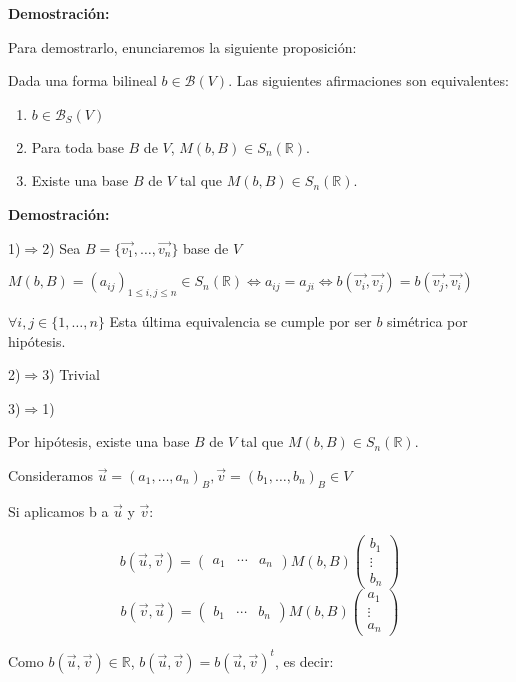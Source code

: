 \documentclass[x11names,table]{report}
\begin{document}
\textbf{Demostración:}

Para demostrarlo, enunciaremos la siguiente proposición:

Dada una forma bilineal $b\in\mathcal{B}(V)$. Las siguientes afirmaciones son equivalentes:

\begin{enumerate}
\item $b\in\mathcal{B}_S(V)$
\item Para toda base $B$ de $V$, $M(b,B)\in S_n(\mathbb{R})$.
\item Existe una base $B$ de $V$ tal que $M(b,B)\in S_n(\mathbb{R})$.
\end{enumerate}
\newpage
\textbf{Demostración:}

1)$\Rightarrow$2)
Sea $B=\{\vec{v_1},\dots,\vec{v_n}\}$ base de $V$

$M(b,B)=(a_{ij})_{1\leq i,j \leq n}\in S_n(\mathbb{R})\Leftrightarrow a_{ij}=a_{ji} \Leftrightarrow b(\vec{v_i},\vec{v_j})=b(\vec{v_j},\vec{v_i})$

$\forall i,j\in\{1,\dots,n\}$ Esta última equivalencia se cumple por ser $b$ simétrica por hipótesis.

2)$\Rightarrow$3) Trivial

3)$\Rightarrow$1)

Por hipótesis, existe una base $B$ de $V$ tal que $M(b,B)\in S_n(\mathbb{R})$. 

Consideramos $\vec{u}=(a_1,\dots,a_n)_B, \vec{v}=(b_1,\dots,b_n)_B\in V$

Si aplicamos b a $\vec{u}$ y $\vec{v}$:

\[b(\vec{u},\vec{v})=\begin{pmatrix}
a_1 & \cdots & a_n
\end{pmatrix}M(b,B)\begin{pmatrix}
b_1 \\ \vdots \\ b_n
\end{pmatrix}\]
\[b(\vec{v},\vec{u})=\begin{pmatrix}
b_1 & \cdots & b_n
\end{pmatrix}M(b,B)\begin{pmatrix}
a_1 \\ \vdots \\ a_n
\end{pmatrix}\]

Como $b(\vec{u},\vec{v})\in\mathbb{R}$, $b(\vec{u},\vec{v})=b(\vec{u},\vec{v})^t$, es decir:
\end{document}
